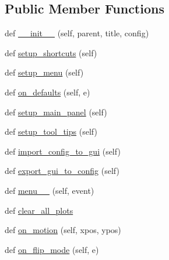 \subsection*{Public Member Functions}
\begin{DoxyCompactItemize}
\item 
def \hyperlink{class_uni_dec_1_1unidec__modules_1_1mainwindow_1_1_mainwindow_ab854ca6e4c994de7f2ef52256112cd64}{\+\_\+\+\_\+init\+\_\+\+\_\+} (self, parent, title, config)
\item 
def \hyperlink{class_uni_dec_1_1unidec__modules_1_1mainwindow_1_1_mainwindow_a81eaf6d9e19fa5d0990faa0e41017439}{setup\+\_\+shortcuts} (self)
\item 
def \hyperlink{class_uni_dec_1_1unidec__modules_1_1mainwindow_1_1_mainwindow_aab7b2d8e0d75d20040f2d036123a5473}{setup\+\_\+menu} (self)
\item 
def \hyperlink{class_uni_dec_1_1unidec__modules_1_1mainwindow_1_1_mainwindow_a36ab3b6496530c6d44bdc8b57a6b3a6a}{on\+\_\+defaults} (self, e)
\item 
def \hyperlink{class_uni_dec_1_1unidec__modules_1_1mainwindow_1_1_mainwindow_adfd43ae134824504a3e14d49c59717f7}{setup\+\_\+main\+\_\+panel} (self)
\item 
def \hyperlink{class_uni_dec_1_1unidec__modules_1_1mainwindow_1_1_mainwindow_a2cdfbd7e7b4b22f820eeb25dadb3052a}{setup\+\_\+tool\+\_\+tips} (self)
\item 
def \hyperlink{class_uni_dec_1_1unidec__modules_1_1mainwindow_1_1_mainwindow_a8900e969df680403ab3c8f7c0aa3e12a}{import\+\_\+config\+\_\+to\+\_\+gui} (self)
\item 
def \hyperlink{class_uni_dec_1_1unidec__modules_1_1mainwindow_1_1_mainwindow_a7ec29418a4262baf47c6dabc3b404c92}{export\+\_\+gui\+\_\+to\+\_\+config} (self)
\item 
def \hyperlink{class_uni_dec_1_1unidec__modules_1_1mainwindow_1_1_mainwindow_aaea13dbb2e56caea46f8a68339845e09}{menu\+\_\+\_} (self, event)
\item 
def \hyperlink{class_uni_dec_1_1unidec__modules_1_1mainwindow_1_1_mainwindow_a108b2e9196cf6b76369cb6054baa1670}{clear\+\_\+all\+\_\+plots}
\item 
def \hyperlink{class_uni_dec_1_1unidec__modules_1_1mainwindow_1_1_mainwindow_a1d55c1e270b97694555f916f8c4ab0cb}{on\+\_\+motion} (self, xpos, ypos)
\item 
def \hyperlink{class_uni_dec_1_1unidec__modules_1_1mainwindow_1_1_mainwindow_abf8fafe7c899f6b9102cb1633967d4e8}{on\+\_\+flip\+\_\+mode} (self, e)

\end{DoxyCompactItemize}
